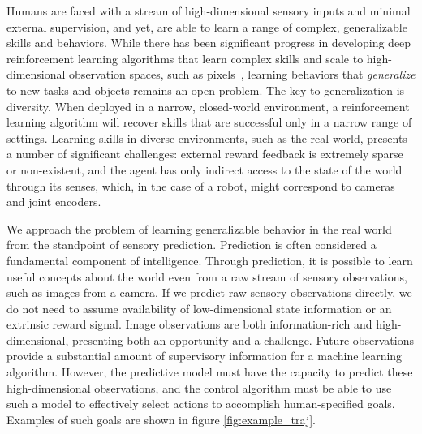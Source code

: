   

Humans are faced with a stream of high-dimensional sensory inputs and minimal external supervision, and yet, are able to learn a range of complex, generalizable skills and behaviors.
While there has been significant progress in developing deep reinforcement learning algorithms that learn complex skills and scale to high-dimensional observation spaces, such as pixels~\cite{tdgammon,atari,e2e,alphago}, learning behaviors that \emph{generalize} to new tasks and objects remains an open problem.
The key to generalization is diversity. When deployed in a narrow, closed-world environment, a reinforcement learning algorithm will recover skills that are successful only in a narrow range of settings. 
Learning skills in diverse  environments, such as the real world, presents a number of significant challenges: external reward feedback is extremely sparse or non-existent, and the agent has only indirect access to the state of the world through its senses, which, in the case of a robot, might correspond to cameras and joint encoders.


We approach the problem of learning generalizable behavior in the real world from the standpoint of sensory prediction. Prediction is often considered a fundamental component of intelligence. Through prediction, it is possible to learn useful concepts about the world even from a raw stream of sensory observations, such as images from a camera. If we predict raw sensory observations directly, we do not need to assume availability of low-dimensional state information or an extrinsic reward signal.  Image observations are both information-rich and high-dimensional, presenting both an opportunity and a challenge. Future observations provide a substantial amount of supervisory information for a machine learning algorithm. However, the predictive model must have the capacity to predict these high-dimensional observations, and the control algorithm must be able to use such a model to effectively select actions to accomplish human-specified goals.  Examples of such goals are shown in figure \ref{fig:example_traj}.



